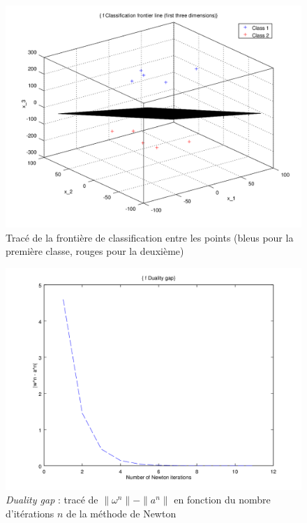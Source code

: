 \documentclass{article}
\begin{document}
         \begin{figure}
           \begin{center}
             \includegraphics[scale=0.5]{images/plane1.png}
             \caption{Tracé de la frontière de classification entre les points (bleus pour la première classe, rouges pour la deuxième)}
           \end{center}
         \end{figure}

         \begin{figure}
           \begin{center}
             \includegraphics[scale=0.5]{images/duality1.png}
             \caption{\emph{Duality gap} : tracé de $\|\omega^n\| - \|a^n\|$ en fonction du nombre d'itérations $n$ de la méthode de Newton}
           \end{center}
         \end{figure}
\end{document}
